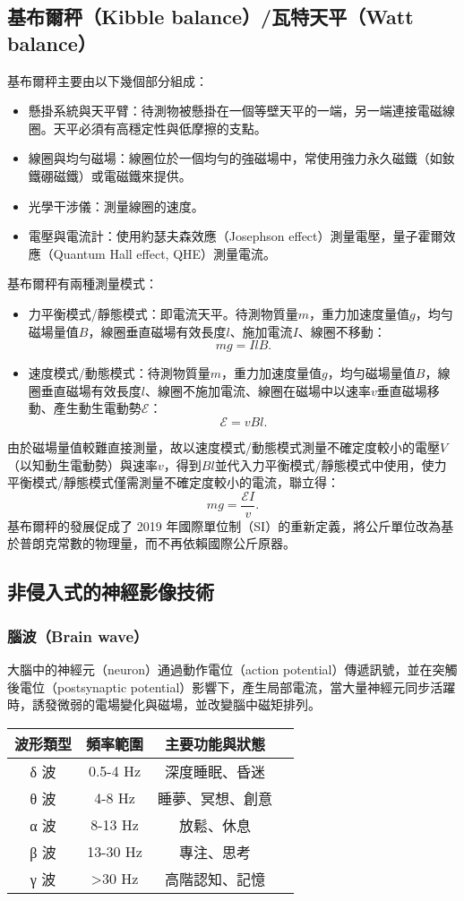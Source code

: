 \documentclass[a4paper,12pt]{report}
\begin{document}
\begin{itemize}
\subsection{基布爾秤（Kibble balance）/瓦特天平（Watt balance）}
基布爾秤主要由以下幾個部分組成：
\begin{itemize}
\item 懸掛系統與天平臂：待測物被懸掛在一個等壁天平的一端，另一端連接電磁線圈。天平必須有高穩定性與低摩擦的支點。
\item 線圈與均勻磁場：線圈位於一個均勻的強磁場中，常使用強力永久磁鐵（如釹鐵硼磁鐵）或電磁鐵來提供。
\item 光學干涉儀：測量線圈的速度。
\item 電壓與電流計：使用約瑟夫森效應（Josephson effect）測量電壓，量子霍爾效應（Quantum Hall effect, QHE）測量電流。
\end{itemize}
基布爾秤有兩種測量模式：
\begin{itemize}
\item 力平衡模式/靜態模式：即電流天平。待測物質量$m$，重力加速度量值$g$，均勻磁場量值$B$，線圈垂直磁場有效長度$l$、施加電流$I$、線圈不移動：
\[mg=I l B.\]
\item 速度模式/動態模式：待測物質量$m$，重力加速度量值$g$，均勻磁場量值$B$，線圈垂直磁場有效長度$l$、線圈不施加電流、線圈在磁場中以速率$v$垂直磁場移動、產生動生電動勢$\mathcal{E}$：
\[\mathcal{E}=vB l.\]
\end{itemize}
由於磁場量值較難直接測量，故以速度模式/動態模式測量不確定度較小的電壓$V$（以知動生電動勢）與速率$v$，得到$B l$並代入力平衡模式/靜態模式中使用，使力平衡模式/靜態模式僅需測量不確定度較小的電流，聯立得：
\[mg = \frac{\mathcal{E} I}{v}.\]
基布爾秤的發展促成了 2019 年國際單位制（SI）的重新定義，將公斤單位改為基於普朗克常數的物理量，而不再依賴國際公斤原器。
\subsection{非侵入式的神經影像技術}
\subsubsection{腦波（Brain wave）}
大腦中的神經元（neuron）通過動作電位（action potential）傳遞訊號，並在突觸後電位（postsynaptic potential）影響下，產生局部電流，當大量神經元同步活躍時，誘發微弱的電場變化與磁場，並改變腦中磁矩排列。
\bct\begin{table}[H]
\centering
\begin{tabular}{|c|c|c|c|}
\hline
\textbf{波形類型} & \textbf{頻率範圍} & \textbf{主要功能與狀態} \\\hline
δ 波 & 0.5-4 Hz & 深度睡眠、昏迷\\\hline
θ 波 & 4-8 Hz & 睡夢、冥想、創意\\\hline
α 波 & 8-13 Hz & 放鬆、休息\\\hline
β 波 & 13-30 Hz & 專注、思考\\\hline
γ 波 & >30 Hz & 高階認知、記憶\\\hline
\end{tabular}
\end{table}\FB\ect

\end{itemize}
\end{document}
